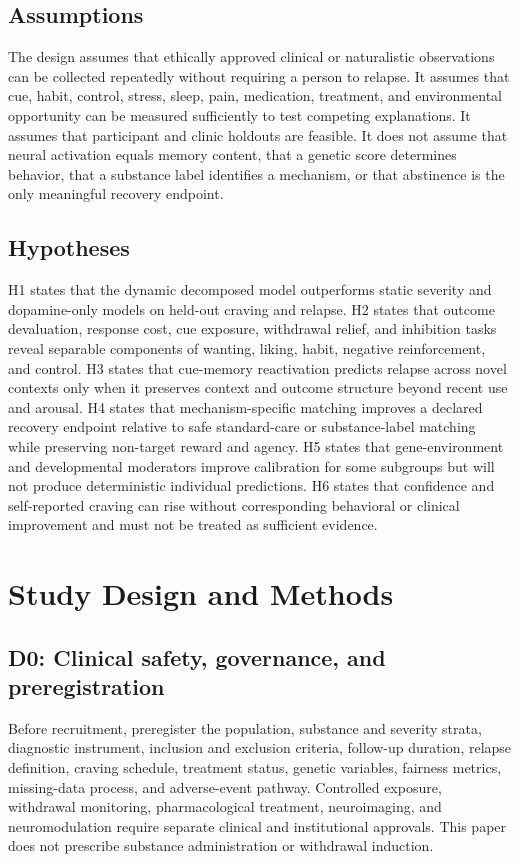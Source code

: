 \documentclass[conference]{IEEEtran}
\begin{document}
\subsection{Assumptions}
The design assumes that ethically approved clinical or naturalistic observations can be collected repeatedly without requiring a person to relapse. It assumes that cue, habit, control, stress, sleep, pain, medication, treatment, and environmental opportunity can be measured sufficiently to test competing explanations. It assumes that participant and clinic holdouts are feasible. It does not assume that neural activation equals memory content, that a genetic score determines behavior, that a substance label identifies a mechanism, or that abstinence is the only meaningful recovery endpoint.

\subsection{Hypotheses}
H1 states that the dynamic decomposed model outperforms static severity and dopamine-only models on held-out craving and relapse. H2 states that outcome devaluation, response cost, cue exposure, withdrawal relief, and inhibition tasks reveal separable components of wanting, liking, habit, negative reinforcement, and control. H3 states that cue-memory reactivation predicts relapse across novel contexts only when it preserves context and outcome structure beyond recent use and arousal. H4 states that mechanism-specific matching improves a declared recovery endpoint relative to safe standard-care or substance-label matching while preserving non-target reward and agency. H5 states that gene-environment and developmental moderators improve calibration for some subgroups but will not produce deterministic individual predictions. H6 states that confidence and self-reported craving can rise without corresponding behavioral or clinical improvement and must not be treated as sufficient evidence.

\section{Study Design and Methods}
\subsection{D0: Clinical safety, governance, and preregistration}
Before recruitment, preregister the population, substance and severity strata, diagnostic instrument, inclusion and exclusion criteria, follow-up duration, relapse definition, craving schedule, treatment status, genetic variables, fairness metrics, missing-data process, and adverse-event pathway. Controlled exposure, withdrawal monitoring, pharmacological treatment, neuroimaging, and neuromodulation require separate clinical and institutional approvals. This paper does not prescribe substance administration or withdrawal induction.
\end{document}
